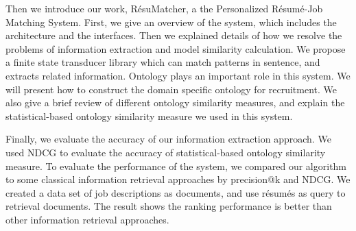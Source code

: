 Then we introduce our work, R\'esuMatcher, a the Personalized R\'esum\'e-Job Matching System. First, we give an overview of the system, which includes the architecture and the interfaces. Then we explained details of how we resolve the problems of information extraction and model similarity calculation. We propose a finite state transducer library which can match patterns in sentence, and extracts related information. Ontology plays an important role in this system. We will present how to construct the domain specific ontology for recruitment. We also give a brief review of different ontology similarity measures, and explain the statistical-based ontology similarity measure we used in this system.

Finally, we evaluate the accuracy of our information extraction approach. We used NDCG to evaluate the accuracy of statistical-based ontology similarity measure. To evaluate the performance of the system, we compared our algorithm to some classical information retrieval approaches by precision@k and NDCG. We created a data set of job descriptions as documents, and use r\'esum\'es as query to retrieval documents. The result shows the ranking performance is better than other information retrieval approaches.
